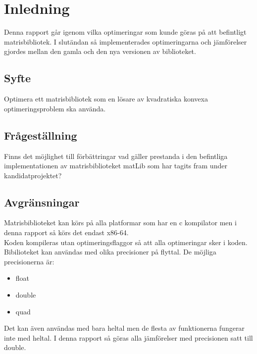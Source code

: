 \section{Inledning}
	Denna rapport går igenom vilka optimeringar som kunde göras på att befintligt matrisbibliotek. I slutändan så implementerades optimeringarna och jämförelser gjordes mellan den gamla och den nya versionen av biblioteket. 
	\subsection{Syfte}
	Optimera ett matrisbibliotek som en lösare av kvadratiska konvexa optimeringsproblem ska använda. 
	\subsection{Frågeställning}
	Finns det möjlighet till förbättringar vad gäller prestanda i den befintliga implementationen av matrisbiblioteket matLib som har tagits fram under kandidatprojektet?
	\subsection{Avgränsningar}
	Matrisbiblioteket kan körs på alla platformar som har en c kompilator men i denna rapport så körs det endast x86-64. 
	\\
	Koden kompileras utan optimeringsflaggor så att alla optimeringar sker i koden. 
	\\
	Bibilioteket kan användas med olika precisioner på flyttal. De möjliga precisionerna är:
	\begin{itemize}
	\item float
	\item double
	\item quad
	\end{itemize}
	Det kan även användas med bara heltal men de flesta av funktionerna fungerar inte med heltal. I denna rapport så göras alla jämförelser med precisionen satt till double. 